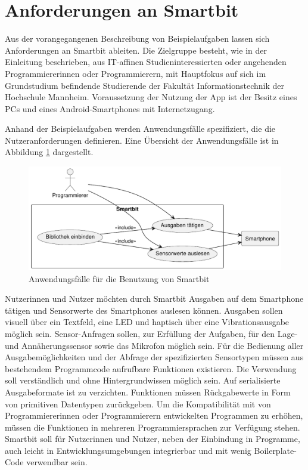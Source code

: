 \documentclass[11pt,a4paper]{report}
\begin{document}
\section{Anforderungen an Smartbit}\label{sec:anforderungen}
Aus der vorangegangenen Beschreibung von Beispielaufgaben lassen sich Anforderungen an Smartbit ableiten.
Die Zielgruppe besteht, wie in der Einleitung beschrieben, aus IT-affinen Studieninteressierten oder angehenden Programmiererinnen oder Programmierern, mit Hauptfokus auf sich im Grundstudium befindende Studierende der Fakultät Informationstechnik der Hochschule Mannheim.
Voraussetzung der Nutzung der App ist der Besitz eines PCs und eines Android-Smartphones  mit Internetzugang.

Anhand der Beispielaufgaben werden Anwendungsfälle spezifiziert, die die Nutzeranforderungen definieren.
Eine Übersicht der Anwendungsfälle ist in Abbildung \ref{fig:usecase} dargestellt.
\begin{figure}[htbp]
  \centering
  \includegraphics[width=.8\textwidth]{images/usecase_usage.pdf}
  \caption{Anwendungsfälle für die Benutzung von Smartbit}
  \label{fig:usecase}
\end{figure}
Nutzerinnen und Nutzer möchten durch Smartbit Ausgaben auf dem Smartphone tätigen und Sensorwerte des Smartphones auslesen können.
Ausgaben sollen visuell über ein Textfeld, eine LED und haptisch über eine Vibrationsausgabe möglich sein.
Sensor-Anfragen sollen, zur Erfüllung der Aufgaben, für den Lage- und Annäherungssensor sowie das Mikrofon möglich sein.
Für die Bedienung aller Ausgabemöglichkeiten und der Abfrage der spezifizierten Sensortypen müssen aus bestehendem Programmcode aufrufbare Funktionen existieren.
Die Verwendung soll verständlich und ohne Hintergrundwissen möglich sein.
Auf serialisierte Ausgabeformate ist zu verzichten.
Funktionen müssen Rückgabewerte in Form von primitiven Datentypen zurückgeben.
Um die Kompatibilität mit von Programmiererinnen oder Programmierern entwickelten Programmen zu erhöhen, müssen die Funktionen in mehreren Programmiersprachen zur Verfügung stehen.
Smartbit soll für Nutzerinnen und Nutzer, neben der Einbindung in Programme, auch leicht in Entwicklungsumgebungen integrierbar und mit wenig Boilerplate-Code verwendbar sein.
\end{document}
